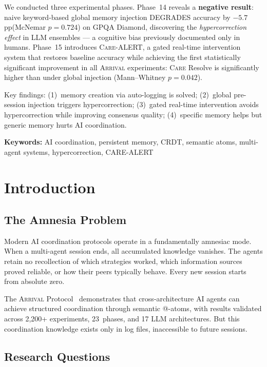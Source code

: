 \documentclass[11pt,a4paper]{article}
\newcommand{\arrival}{\textsc{Arrival}\xspace}
\newcommand{\care}{\textsc{Care}\xspace}
\newcommand{\pp}{\,pp\xspace}
\begin{document}
We conducted three experimental phases.  Phase~14 reveals a
\textbf{negative result}: naive keyword-based global memory injection
DEGRADES accuracy by $-5.7$\pp (McNemar $p = 0.724$) on GPQA Diamond,
discovering the \textit{hypercorrection effect} in LLM ensembles --- a
cognitive bias previously documented only in humans.  Phase~15 introduces
\care-ALERT, a gated real-time intervention system that restores
baseline accuracy while achieving the first statistically significant
improvement in all \arrival experiments: \care Resolve is significantly
higher than under global injection (Mann--Whitney $p = 0.042$).

Key findings: (1)~memory creation via auto-logging is solved;
(2)~global pre-session injection triggers hypercorrection;
(3)~gated real-time intervention avoids hypercorrection while
improving consensus quality; (4)~specific memory helps but generic
memory hurts AI coordination.

\textbf{Keywords:} AI coordination, persistent memory, CRDT, semantic
atoms, multi-agent systems, hypercorrection, CARE-ALERT

\section{Introduction}\label{sec:intro}

\subsection{The Amnesia Problem}

Modern AI coordination protocols operate in a fundamentally amnesiac
mode.  When a multi-agent session ends, all accumulated knowledge
vanishes.  The agents retain no recollection of which strategies worked,
which information sources proved reliable, or how their peers typically
behave.  Every new session starts from absolute zero.

The \arrival Protocol~\cite{kelevra2026arrival} demonstrates that
cross-architecture AI agents can achieve structured coordination through
semantic @-atoms, with results validated across 2,200+ experiments,
23~phases, and 17 LLM architectures.  But this coordination knowledge
exists only in log files, inaccessible to future sessions.

\subsection{Research Questions}
\end{document}
